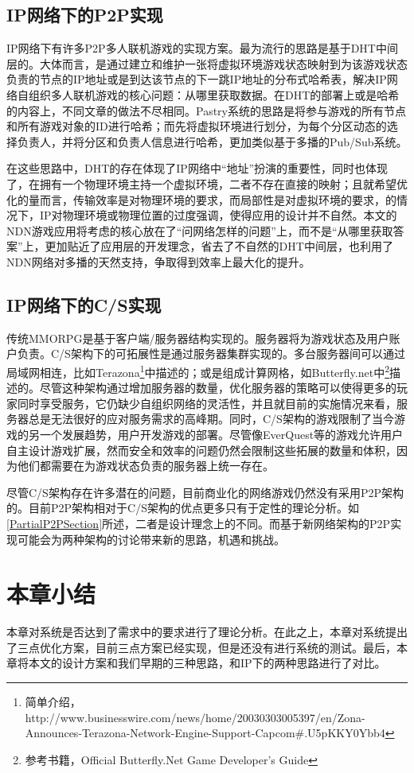 \subsection{IP网络下的P2P实现}
\par
IP网络下有许多P2P多人联机游戏的实现方案。最为流行的思路是基于DHT中间层的。大体而言，是通过建立和维护一张将虚拟环境游戏状态映射到为该游戏状态负责的节点的IP地址或是到达该节点的下一跳IP地址的分布式哈希表，解决IP网络自组织多人联机游戏的核心问题：从哪里获取数据。在DHT的部署上或是哈希的内容上，不同文章的做法不尽相同。Pastry系统\cite{IPP2PMMORPG1}的思路是将参与游戏的所有节点和所有游戏对象的ID进行哈希；而先将虚拟环境进行划分，为每个分区动态的选择负责人，并将分区和负责人信息进行哈希，更加类似基于多播的Pub/Sub系统\cite{PubSubRef}。
\par
在这些思路中，DHT的存在体现了IP网络中“地址”扮演的重要性，同时也体现了，在拥有一个物理环境主持一个虚拟环境，二者不存在直接的映射；且就希望优化的量而言，传输效率是对物理环境的要求，而局部性是对虚拟环境的要求，的情况下，IP对物理环境或物理位置的过度强调，使得应用的设计并不自然。本文的NDN游戏应用将考虑的核心放在了“问网络怎样的问题”上，而不是“从哪里获取答案”上，更加贴近了应用层的开发理念，省去了不自然的DHT中间层，也利用了NDN网络对多播的天然支持，争取得到效率上最大化的提升。
\subsection{IP网络下的C/S实现}
\par
传统MMORPG是基于客户端/服务器结构实现的。服务器将为游戏状态及用户账户负责。C/S架构下的可拓展性是通过服务器集群实现的。多台服务器间可以通过局域网相连，比如Terazona\footnote{简单介绍，http://www.businesswire.com/news/home/20030303005397/en/Zona-Announces-Terazona-Network-Engine-Support-Capcom\#.U5pKKY0Ybb4}中描述的；或是组成计算网格，如Butterfly.net中\footnote{参考书籍，Official Butterfly.Net Game Developer's Guide}描述的。尽管这种架构通过增加服务器的数量，优化服务器的策略可以使得更多的玩家同时享受服务，它仍缺少自组织网络的灵活性，并且就目前的实施情况来看，服务器总是无法很好的应对服务需求的高峰期。同时，C/S架构的游戏限制了当今游戏的另一个发展趋势，用户开发游戏的部署。尽管像EverQuest等的游戏允许用户自主设计游戏扩展，然而安全和效率的问题仍然会限制这些拓展的数量和体积，因为他们都需要在为游戏状态负责的服务器上统一存在。
\par
尽管C/S架构存在许多潜在的问题，目前商业化的网络游戏仍然没有采用P2P架构的。目前P2P架构相对于C/S架构的优点更多只有于定性的理论分析。如\ref{PartialP2PSection}所述，二者是设计理念上的不同。而基于新网络架构的P2P实现可能会为两种架构的讨论带来新的思路，机遇和挑战。
\section{本章小结}
本章对系统是否达到了需求中的要求进行了理论分析。在此之上，本章对系统提出了三点优化方案，目前三点方案已经实现，但是还没有进行系统的测试。最后，本章将本文的设计方案和我们早期的三种思路，和IP下的两种思路进行了对比。
